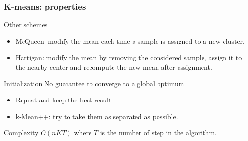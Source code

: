 \documentclass{beamer}\usepackage[]{graphicx}\usepackage[]{color}
\begin{document}
\begin{frame}
\frametitle{K-means: properties}
  
  \begin{block}{Other schemes}
    \begin{itemize}
      \item \alert{McQueen}: modify the mean each time a sample is assigned to a new cluster.
      \item \alert{Hartigan}: modify the mean by removing the considered sample, assign it to the nearby center and recompute the new mean after assignment.
    \end{itemize}
  \end{block}
  
  \begin{block}{Initialization}
    No guarantee to converge to a global optimum
    \begin{itemize}
      \item Repeat and keep the best result
      \item k-Mean++: try to take them as separated as possible.
    \end{itemize}
  \end{block}

  \begin{block}{Complexity}
     $O(n K T)$ where $T$ is the number of step in the algorithm.
  \end{block}
  
\end{frame}
\end{document}
